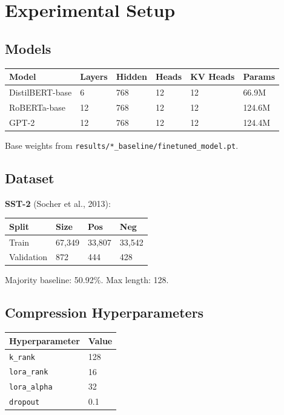 \section{Experimental Setup}

\subsection{Models}

\begin{table}[H]
\centering
\small
\begin{tabular}{llllll}
\toprule
\textbf{Model} & \textbf{Layers} & \textbf{Hidden} & \textbf{Heads} & \textbf{KV Heads} & \textbf{Params} \\
\midrule
DistilBERT-base & 6 & 768 & 12 & 12 & 66.9M \\
RoBERTa-base & 12 & 768 & 12 & 12 & 124.6M \\
GPT-2 & 12 & 768 & 12 & 12 & 124.4M \\
\bottomrule
\end{tabular}
\end{table}

Base weights from \texttt{results/*\_baseline/finetuned\_model.pt}.

\subsection{Dataset}

\textbf{SST-2} (Socher et al., 2013):

\begin{table}[H]
\centering
\small
\begin{tabular}{llll}
\toprule
\textbf{Split} & \textbf{Size} & \textbf{Pos} & \textbf{Neg} \\
\midrule
Train & 67,349 & 33,807 & 33,542 \\
Validation & 872 & 444 & 428 \\
\bottomrule
\end{tabular}
\end{table}

Majority baseline: 50.92\%. Max length: 128.

\subsection{Compression Hyperparameters}

\begin{table}[H]
\centering
\small
\begin{tabular}{ll}
\toprule
\textbf{Hyperparameter} & \textbf{Value} \\
\midrule
\texttt{k\_rank} & 128 \\
\texttt{lora\_rank} & 16 \\
\texttt{lora\_alpha} & 32 \\
\texttt{dropout} & 0.1 \\
\bottomrule
\end{tabular}
\end{table}

